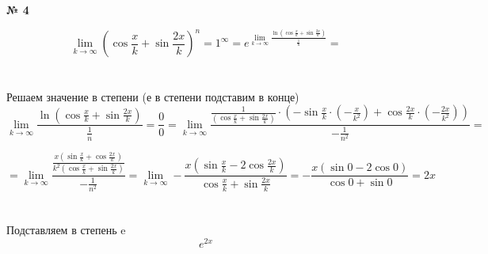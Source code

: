 \documentclass{article}
\begin{document}
\textbf{№ 4} 
\Large

$$ \lim\limits_{k \to \infty} \left( \cos{\frac{x}{k}} + \sin{\frac{2x}{k}} \right)^{n}
= 1^{\infty}
= e^{\lim\limits_{k \to \infty} \frac{\ln{\left( \cos{\frac{x}{k}} + \sin{\frac{2x}{k}} \right)}}{\frac{1}{n}}}
= $$
\\
\\
Решаем значение в степени (е в степени подставим в конце)
$$ \lim\limits_{k \to \infty} \frac{\ln{\left( \cos{\frac{x}{k}} + \sin{\frac{2x}{k}} \right)}}{\frac{1}{n}}
= \frac{0}{0}
= \lim\limits_{k \to \infty} \frac{ \frac{1}{\left( \cos{\frac{x}{k}} + \sin{\frac{2x}{k}} \right)} \cdot  \left( -\sin{\frac{x}{k}} \cdot (-\frac{x}{k^2}) + \cos{\frac{2x}{k}} \cdot (-\frac{2x}{k^2}) \right)}{-\frac{1}{n^2}} 
= $$

$$ = \lim\limits_{k \to \infty} \frac{\frac{x\left( \sin{\frac{x}{k}} + \cos{\frac{2x}{k}} \right)}{k^2 \left( \cos{\frac{x}{k}} + \sin{\frac{2x}{k}} \right)}}{-\frac{1}{n^2}} 
= \lim\limits_{k \to \infty} - \frac{x\left( \sin{\frac{x}{k}} - 2\cos{\frac{2x}{k}} \right)}{\cos{\frac{x}{k}} + \sin{\frac{2x}{k}}} 
= - \frac{x\left( \sin{0} - 2\cos{0} \right)}{\cos{0} + \sin{0}} 
= 2x $$
\\
\\
Подставляем в степень e
$$ e^{2x} $$
\end{document}
